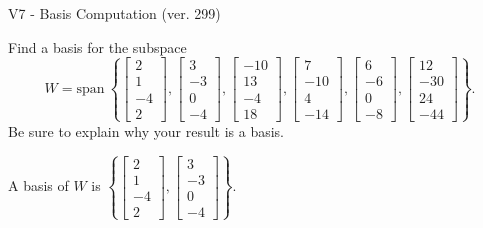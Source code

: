 \begin{exercise}
  \begin{exerciseTitle}V7 - Basis Computation (ver. 299)\end{exerciseTitle}
  \begin{exerciseStatement}
    Find a basis for the subspace 
\[W=\mathrm{span}\ \left\{\left[\begin{array}{r}
2 \\
1 \\
-4 \\
2
\end{array}\right] , \left[\begin{array}{r}
3 \\
-3 \\
0 \\
-4
\end{array}\right] , \left[\begin{array}{r}
-10 \\
13 \\
-4 \\
18
\end{array}\right] , \left[\begin{array}{r}
7 \\
-10 \\
4 \\
-14
\end{array}\right] , \left[\begin{array}{r}
6 \\
-6 \\
0 \\
-8
\end{array}\right] , \left[\begin{array}{r}
12 \\
-30 \\
24 \\
-44
\end{array}\right]\right\}.\]
 Be sure to explain why your result is a basis.


  \end{exerciseStatement}
  \begin{exerciseAnswer}
   A basis of \(W\) is  \(\left\{\left[\begin{array}{r}
2 \\
1 \\
-4 \\
2
\end{array}\right] , \left[\begin{array}{r}
3 \\
-3 \\
0 \\
-4
\end{array}\right]\right\}\).
  


  \end{exerciseAnswer}
\end{exercise}
